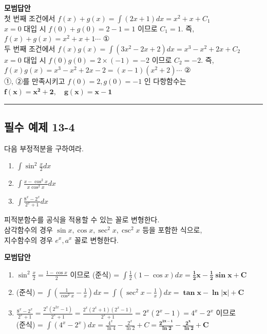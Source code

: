 \documentclass[a4paper,11pt]{article}
\begin{document}
\textbf{모범답안}\\
첫 번째 조건에서 $f(x)+g(x) = \int (2x+1)dx = x^2+x+C_1$\\
$x=0$ 대입 시 $f(0)+g(0)=2-1=1$ 이므로 $C_1=1$. 즉, $f(x)+g(x)=x^2+x+1 \cdots$ ①\\
두 번째 조건에서 $f(x)g(x) = \int (3x^2-2x+2)dx = x^3-x^2+2x+C_2$\\
$x=0$ 대입 시 $f(0)g(0)=2 \times (-1)=-2$ 이므로 $C_2=-2$. 즉, $f(x)g(x)=x^3-x^2+2x-2 = (x-1)(x^2+2) \cdots$ ②\\
①, ②를 만족시키고 $f(0)=2, g(0)=-1$ 인 다항함수는 \\
$\mathbf{f(x)=x^2+2, \quad g(x)=x-1}$

\vspace{0.5cm}
\hrule
\vspace{0.5cm}

\subsection*{필수 예제 13-4}
다음 부정적분을 구하여라.
\begin{enumerate}[label=(\arabic*)]
    \item $\displaystyle \int \sin^2 \frac{x}{2} dx$
    \item $\displaystyle \int \frac{x-\cos^2 x}{x \cos^2 x} dx$
    \item $\displaystyle \int \frac{8^x - 2^x}{2^x + 1} dx$
\end{enumerate}

\begin{studybox}
피적분함수를 공식을 적용할 수 있는 꼴로 변형한다.\\ 삼각함수의 경우 $\sin x, \cos x, \sec^2 x, \csc^2 x$ 등을 포함한 식으로,\\ 지수함수의 경우 $e^x, a^x$ 꼴로 변형한다.
\end{studybox}

\textbf{모범답안}
\begin{enumerate}[label=(\arabic*)]
    \item $\displaystyle \sin^2 \frac{x}{2} = \frac{1-\cos x}{2}$ 이므로 (준식) = $\displaystyle \int \frac{1}{2}(1-\cos x)dx = \mathbf{\frac{1}{2}x - \frac{1}{2}\sin x + C}$
    \item (준식) = $\displaystyle \int (\frac{1}{\cos^2 x} - \frac{1}{x})dx = \int (\sec^2 x - \frac{1}{x})dx = \mathbf{\tan x - \ln|x| + C}$
    \item $\displaystyle \frac{8^x-2^x}{2^x+1} = \frac{2^x(2^{2x}-1)}{2^x+1} = \frac{2^x(2^x+1)(2^x-1)}{2^x+1} = 2^x(2^x-1) = 4^x-2^x$ 이므로\\
    (준식) = $\displaystyle \int (4^x-2^x)dx = \frac{4^x}{\ln 4} - \frac{2^x}{\ln 2} + C = \mathbf{\frac{2^{2x-1}}{\ln 2} - \frac{2^x}{\ln 2} + C}$
\end{enumerate}
\end{document}
